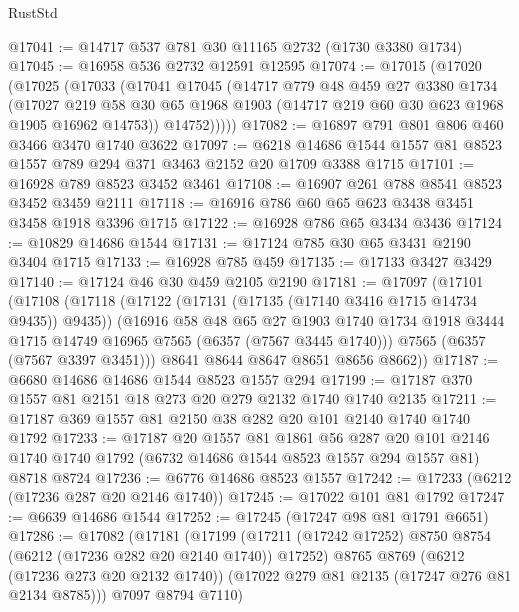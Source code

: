 \begin{lexlean}{RustStd}
\begin{coremodule}
@17041 := @14717 @537 @781 @30 @11165 @2732 (@1730 @3380 @1734)
@17045 := @16958 @536 @2732 @12591 @12595
@17074 := @17015
    (@17020
      (@17025
        (@17033
          (@17041
            @17045
            (@14717
              @779
              @48
              @459
              @27
              @3380
              @1734
              (@17027
                @219
                @58
                @30
                @65
                @1968
                @1903
                (@14717 @219 @60 @30 @623 @1968 @1905 @16962 @14753))
              @14752)))))
@17082 := @16897 @791 @801 @806 @460 @3466 @3470 @1740 @3622
@17097 := @6218 @14686 @1544 @1557 @81 @8523 @1557 @789 @294 @371 @3463 @2152 @20 @1709 @3388 @1715
@17101 := @16928 @789 @8523 @3452 @3461
@17108 := @16907 @261 @788 @8541 @8523 @3452 @3459 @2111
@17118 := @16916 @786 @60 @65 @623 @3438 @3451 @3458 @1918 @3396 @1715
@17122 := @16928 @786 @65 @3434 @3436
@17124 := @10829 @14686 @1544
@17131 := @17124 @785 @30 @65 @3431 @2190 @3404 @1715
@17133 := @16928 @785 @459
@17135 := @17133 @3427 @3429
@17140 := @17124 @46 @30 @459 @2105 @2190
@17181 := @17097
    (@17101
      (@17108
        (@17118
          (@17122 (@17131 (@17135 (@17140 @3416 @1715 @14734 @9435)) @9435))
          (@16916
            @58
            @48
            @65
            @27
            @1903
            @1740
            @1734
            @1918
            @3444
            @1715
            @14749
            @16965
            @7565
            (@6357 (@7567 @3445 @1740)))
          @7565
          (@6357 (@7567 @3397 @3451)))
        @8641
        @8644
        @8647
        @8651
        @8656
        @8662))
@17187 := @6680 @14686 @14686 @1544 @8523 @1557 @294
@17199 := @17187 @370 @1557 @81 @2151 @18 @273 @20 @279 @2132 @1740 @1740 @2135
@17211 := @17187 @369 @1557 @81 @2150 @38 @282 @20 @101 @2140 @1740 @1740 @1792
@17233 := @17187
    @20
    @1557
    @81
    @1861
    @56
    @287
    @20
    @101
    @2146
    @1740
    @1740
    @1792
    (@6732 @14686 @1544 @8523 @1557 @294 @1557 @81)
    @8718
    @8724
@17236 := @6776 @14686 @8523 @1557
@17242 := @17233 (@6212 (@17236 @287 @20 @2146 @1740))
@17245 := @17022 @101 @81 @1792
@17247 := @6639 @14686 @1544
@17252 := @17245 (@17247 @98 @81 @1791 @6651)
@17286 := @17082
    (@17181
      (@17199
        (@17211 (@17242 @17252) @8750 @8754 (@6212 (@17236 @282 @20 @2140 @1740)) @17252)
        @8765
        @8769
        (@6212 (@17236 @273 @20 @2132 @1740))
        (@17022 @279 @81 @2135 (@17247 @276 @81 @2134 @8785)))
      @7097
      @8794
      @7110)

\end{coremodule}
\end{lexlean}
